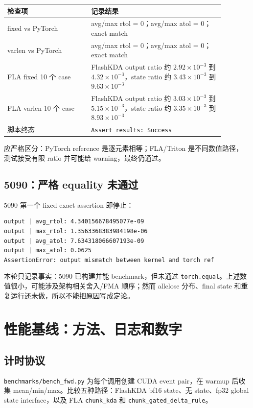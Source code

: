 \documentclass[11pt,a4paper,fontset=none]{ctexart}
\newcommand{\code}[1]{\texttt{#1}}
\begin{document}
\begin{longtable}{@{}L{0.34\linewidth}L{0.54\linewidth}@{}}
\toprule
检查项 & 记录结果 \\
\midrule
\endhead
\bottomrule
\endlastfoot
fixed vs PyTorch & avg/max rtol = 0；avg/max atol = 0；exact match \\
varlen vs PyTorch & avg/max rtol = 0；avg/max atol = 0；exact match \\
FLA fixed 10 个 case & FlashKDA output ratio 约 \(2.92\times10^{-3}\) 到 \(4.32\times10^{-3}\)，state ratio 约 \(3.43\times10^{-3}\) 到 \(9.63\times10^{-3}\) \\
FLA varlen 10 个 case & FlashKDA output ratio 约 \(3.03\times10^{-3}\) 到 \(5.15\times10^{-3}\)，state ratio 约 \(3.35\times10^{-3}\) 到 \(8.93\times10^{-3}\) \\
脚本终态 & \code{Assert results: Success} \\
\end{longtable}

应严格区分：PyTorch reference 是逐元素相等；FLA/Triton 是不同数值路径，
测试接受有限 ratio 并可能给 warning，最终仍通过。

\subsection{5090：严格 equality 未通过}

5090 第一个 fixed exact assertion 即停止：

\begin{lstlisting}
output | avg_rtol: 4.340156678495077e-09
output | max_rtol: 1.3563368383984198e-06
output | avg_atol: 7.634318066607193e-09
output | max_atol: 0.0625
AssertionError: output mismatch between kernel and torch ref
\end{lstlisting}

本轮只记录事实：5090 已构建并能 benchmark，但未通过
\code{torch.equal}。上述数值很小，可能涉及架构相关舍入/FMA 顺序；然而
allclose 分布、final state 和重复运行还未做，所以不能把原因写成定论。

\section{性能基线：方法、日志和数字}

\subsection{计时协议}

\code{benchmarks/bench\_fwd.py} 为每个调用创建 CUDA event pair，在 warmup
后收集 mean/min/max。比较五种路径：FlashKDA bf16 state、无 state、fp32
global state interface，以及 FLA \code{chunk\_kda} 和
\code{chunk\_gated\_delta\_rule}。
\end{document}
